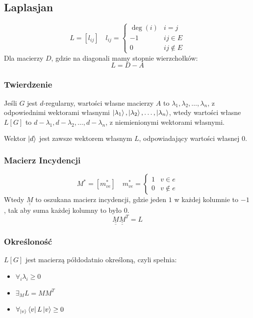 \documentclass{../notatki}
\begin{document}
\subsection{Laplasjan}

$$
L = \left[l_{ij}\right] \quad l_{ij} =
\begin{cases}
  \deg(i) & i = j \\
  -1 & ij \in E \\
  0 & ij \notin E
\end{cases}
$$
Dla macierzy $D$, gdzie na diagonali mamy stopnie wierzchołków:
$$
L = D - A
$$

\subsubsection{Twierdzenie}

Jeśli $G$ jest $d$-regularny, wartości własne macierzy $A$ to
$\lambda_1, \lambda_2, \dots, \lambda_n$, z odpowiednimi wektorami
własnymi $\ket{\lambda_1}, \ket{\lambda_2}, \dots, \ket{\lambda_n}$,
wtedy wartości własne $L[G]$ to $d - \lambda_1, d - \lambda_2, \dots,
d - \lambda_n$, z niemienionymi wektorami własnymi.

Wektor $\ket{d}$ jest zawsze wektorem własnym $L$, odpowiadający
wartości własnej $0$.

\subsubsection{Macierz Incydencji}

$$
M^* = \left[m^*_{ve}\right] \quad m^*_{ve} =
\begin{cases}
  1 & v \in e \\
  0 & v \notin e
\end{cases}
$$
Wtedy $\underline{\underline{M}}$ to oszukana macierz incydencji, gdzie
jeden $1$ w każdej kolumnie to $-1$, tak aby suma każdej kolumny to było $0$.
$$
\underline{\underline{M}}\underline{\underline{M}}^T = L
$$

\subsubsection{Określoność}

$L[G]$ jest macierzą półdodatnio określoną, czyli spełnia:
\begin{itemize}
  \item $\forall_i \lambda_i \geq 0$
  \item $\exists_M L = MM^T$
  \item $\forall_{\ket{v}} \bra{v}L\ket{v} \geq 0$
\end{itemize}
\end{document}
